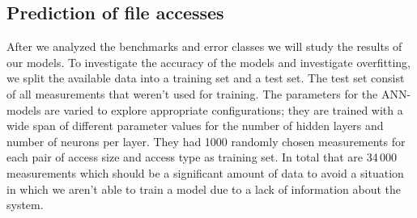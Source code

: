 \documentclass{superfri}
\begin{document}
\subsection{Prediction of file accesses}
After we analyzed the benchmarks and error classes we will study the results of our models.
To investigate the accuracy of the models and investigate overfitting, we split the available data into a training set and a test set. 
The test set consist of all measurements that weren't used for training.
The parameters for the ANN-models are varied to explore appropriate configurations; they are trained with a wide span of different parameter values for the number of hidden layers and number of neurons per layer.
They had 1000 randomly chosen measurements for each pair of access size and access type as training set. %
In total that are 34\,000 measurements which should be a significant amount of data to avoid a situation in which we aren't able to train a model due to a lack of information about the system. 

\medskip
\end{document}
